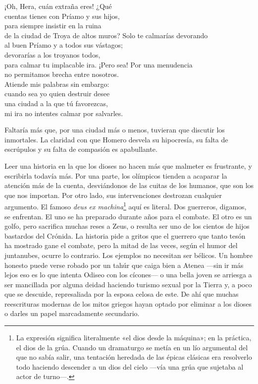 \begin{versocita}
¡Oh, Hera, cuán extraña eres! ¿Qué\\
cuentas tienes con Príamo y sus hijos,\\
para siempre insistir en la ruina\\
de la ciudad de Troya de altos muros?
\stanzabreak
Solo te calmarías devorando\\
al buen Príamo y a todos sus vástagos;\\
devorarías a los troyanos todos,\\
para calmar tu implacable ira.
\stanzabreak
¡Pero sea! Por una menudencia\\
no permitamos brecha entre nosotros.\\
Atiende mis palabras sin embargo:\\
cuando sea yo quien destruir desee\\
una ciudad a la que tú favorezcas,\\
mi ira no intentes calmar por salvarles.
\end{versocita}

Faltaría más que, por una ciudad más o menos, tuvieran que discutir los inmortales. La claridad con que Homero desvela su hipocresía, su falta de escrúpulos y su falta de compasión es apabullante.

Leer una historia en la que los dioses no hacen más que malmeter es frustrante, y escribirla todavía más. Por una parte, los olímpicos tienden a acaparar la atención más de la cuenta, desviándonos de las cuitas de los humanos, que son los que nos importan. Por otro lado, sus intervenciones destrozan cualquier argumento. El famoso \emph{deus ex machina}\footnote{La expresión significa literalmente «el dios desde la máquina»; en la práctica, el dios de la grúa. Cuando un dramaturgo se metía en un lío argumental del que no sabía salir, una tentación heredada de las épicas clásicas era resolverlo todo haciendo descender a un dios del cielo ---vía una grúa que sujetaba al actor de turno---.} aquí es literal. Dos guerreros, digamos, se enfrentan. El uno se ha preparado durante años para el combate. El otro es un golfo, pero sacrifica muchas reses a Zeus, o resulta ser uno de los cientos de hijos bastardos del Crónida. La historia pide a gritos que el guerrero que tanto tesón ha mostrado gane el combate, pero la mitad de las veces, según el humor del juntanubes, ocurre lo contrario. Los ejemplos no necesitan ser bélicos. Un hombre honesto puede verse robado por un tahúr que caiga bien a Atenea ---sin ir más lejos eso es lo que intenta Odiseo con los cícones--- o una bella joven se arriesga a ser mancillada por alguna deidad haciendo turismo sexual por la Tierra y, a poco que se descuide, represaliada por la esposa celosa de este. De ahí que muchas reescrituras modernas de los mitos griegos hayan optado por eliminar a los dioses o darles un papel marcadamente secundario.

